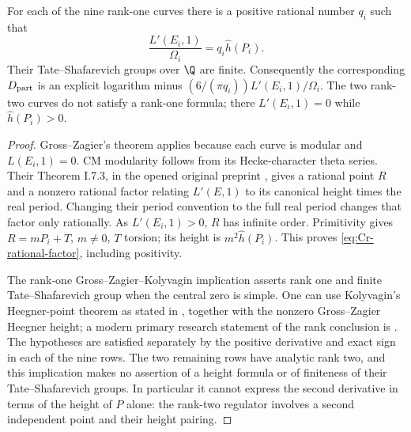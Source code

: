 \begin{statement}
For each of the nine rank-one curves there is a positive rational
number $q_i$ such that
\begin{equation}\label{eq:Cr-rational-factor}
 \frac{L'(E_i,1)}{\Omega_i}=q_i\widehat h(P_i).
\end{equation}
Their Tate--Shafarevich groups over $\Q$ are finite. Consequently
the corresponding $D_{\rm part}$ is an explicit logarithm minus
$(6/(\pi q_i))L'(E_i,1)/\Omega_i$. The two rank-two curves do
not satisfy a rank-one formula; there $L'(E_i,1)=0$ while
$\widehat h(P_i)>0$.
\end{statement}
\begin{proof}
Gross--Zagier's theorem applies because each curve is modular and
$L(E_i,1)=0$. CM modularity follows from its Hecke-character
theta series. Their Theorem I.7.3, in the opened original
preprint \citep{CrGrossZagier1986}, gives a rational point $R$ and
a nonzero rational factor relating $L'(E,1)$ to its canonical
height times the real period. Changing their period convention
to the full real period changes that factor only rationally.
As $L'(E_i,1)>0$, $R$ has infinite order. Primitivity gives
$R=mP_i+T$, $m\ne0$, $T$ torsion; its height is
$m^2\widehat h(P_i)$. This proves
\eqref{eq:Cr-rational-factor}, including positivity.

The rank-one Gross--Zagier--Kolyvagin implication asserts rank one
and finite Tate--Shafarevich group when the central zero is simple.
One can use Kolyvagin's Heegner-point theorem as stated in
\citet[Theorem 1.3]{CrGross1991}, together with the nonzero
Gross--Zagier Heegner height; a modern primary research statement
of the rank conclusion is \citet[Theorem 1.1]{CrJetchev2008}.
The hypotheses are satisfied separately by the positive derivative
and exact sign in each of the nine rows. The two remaining rows
have analytic rank two, and this implication makes no assertion
of a height formula or of finiteness of their Tate--Shafarevich
groups. In particular it cannot express the second derivative
in terms of the height of $P$ alone: the rank-two regulator involves
a second independent point and their height pairing.
\end{proof}
